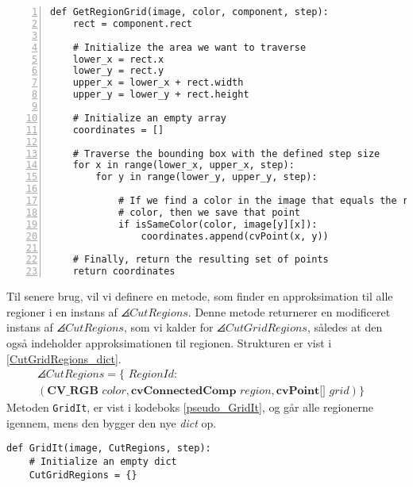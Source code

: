 {\begin{lstlisting}[caption={Metode til at approksimere en regions
    form. Bemærk linje 19, hvor der ses et eksempel på det omvendte
    koordinatsystem i \emph{OpenCV}.}, captionpos=b,
    label={pseudo_GetRegionGrid}, frame=tb,
    breaklines=false, float=bh, numbers=left]
def GetRegionGrid(image, color, component, step):
    rect = component.rect

    # Initialize the area we want to traverse
    lower_x = rect.x
    lower_y = rect.y
    upper_x = lower_x + rect.width
    upper_y = lower_y + rect.height

    # Initialize an empty array
    coordinates = []

    # Traverse the bounding box with the defined step size
    for x in range(lower_x, upper_x, step):
        for y in range(lower_y, upper_y, step):

            # If we find a color in the image that equals the region
            # color, then we save that point
            if isSameColor(color, image[y][x]):
                coordinates.append(cvPoint(x, y))

    # Finally, return the resulting set of points
    return coordinates
\end{lstlisting}
Til senere brug, vil vi definere en metode, som finder en approksimation
til alle regioner i en instans af $\angles{CutRegions}$. Denne metode
returnerer en modificeret instans af $\angles{CutRegions}$, som vi
kalder for $\angles{CutGridRegions}$, således at den også indeholder
approksimationen til regionen. Strukturen er vist i
\eqref{CutGridRegions_dict}.
\begin{multline}
    \angles{CutRegions} = \{ \textit{~RegionId} : \\
    (\textbf{CV\_RGB~}\textit{color}, \textbf{cvConnectedComp~}\textit{region}, \textbf{cvPoint[]~}\textit{grid}) \}\quad
    \label{CutGridRegions_dict}
\end{multline}
Metoden \texttt{GridIt}, er vist i kodeboks \ref{pseudo_GridIt}, og går
alle regionerne igennem, mens den bygger den nye \emph{dict} op.

\begin{lstlisting}[caption={Metode, som finder approksimationen til alle
    regioner i en instans af $\angles{CutRegions}$.}, captionpos=b,
    label={pseudo_GridIt}, frame=tb,
    breaklines=false, float=t]
def GridIt(image, CutRegions, step):
    # Initialize an empty dict
    CutGridRegions = {}


\end{lstlisting}}

